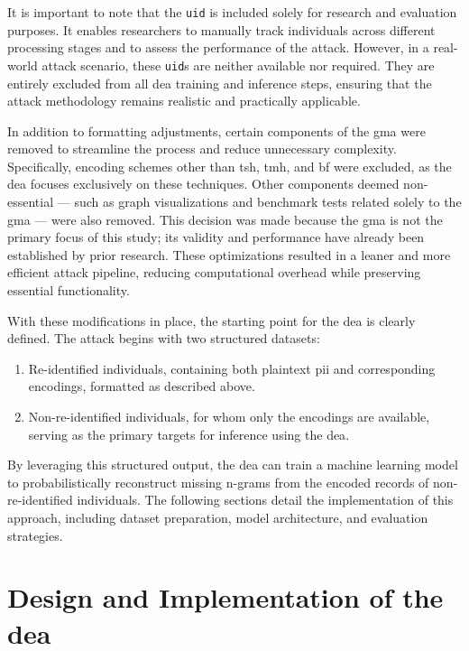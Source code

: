 It is important to note that the \texttt{uid} is included solely for research and evaluation purposes.
It enables researchers to manually track individuals across different processing stages and to assess the performance of the attack.
However, in a real-world attack scenario, these \texttt{uid}s are neither available nor required.
They are entirely excluded from all \ac{dea} training and inference steps, ensuring that the attack methodology remains realistic and practically applicable.

In addition to formatting adjustments, certain components of the \ac{gma} were removed to streamline the process and reduce unnecessary complexity.
Specifically, encoding schemes other than \ac{tsh}, \ac{tmh}, and \ac{bf} were excluded, as the \ac{dea} focuses exclusively on these techniques.
Other components deemed non-essential — such as graph visualizations and benchmark tests related solely to the \ac{gma} — were also removed.
This decision was made because the \ac{gma} is not the primary focus of this study; its validity and performance have already been established by prior research.
These optimizations resulted in a leaner and more efficient attack pipeline, reducing computational overhead while preserving essential functionality.

With these modifications in place, the starting point for the \ac{dea} is clearly defined.
The attack begins with two structured datasets:

\begin{enumerate}
    \item Re-identified individuals, containing both plaintext \ac{pii} and corresponding encodings, formatted as described above.
    \item Non-re-identified individuals, for whom only the encodings are available, serving as the primary targets for inference using the \ac{dea}.
\end{enumerate}

By leveraging this structured output, the \ac{dea} can train a machine learning model to probabilistically reconstruct missing n-grams from the encoded records of non-re-identified individuals.
The following sections detail the implementation of this approach, including dataset preparation, model architecture, and evaluation strategies.

\section{Design and Implementation of the \ac{dea}} \label{sec:designandimplementation}


